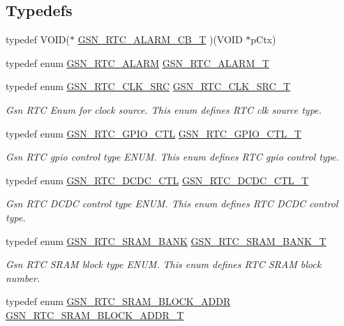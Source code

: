 \subsection*{Typedefs}
\begin{DoxyCompactItemize}
\item 
typedef VOID($\ast$ \hyperlink{a00582_a624c15b10850050c5064e7949e4bd15f}{GSN\_\-RTC\_\-ALARM\_\-CB\_\-T} )(VOID $\ast$pCtx)
\item 
typedef enum \hyperlink{a00582_a7ac2ec492b22971df1e2f294bdb35a06}{GSN\_\-RTC\_\-ALARM} \hyperlink{a00582_a55a97ef6cc63c0ef0c4032ed2324bd2f}{GSN\_\-RTC\_\-ALARM\_\-T}
\item 
typedef enum \hyperlink{a00651_gaace509e7754aacb14b76f77e68fa9b2a}{GSN\_\-RTC\_\-CLK\_\-SRC} \hyperlink{a00651_gadb97e494297aadf7b5dda5f239d96c80}{GSN\_\-RTC\_\-CLK\_\-SRC\_\-T}
\begin{DoxyCompactList}\small\item\em Gsn RTC Enum for clock source. This enum defines RTC clk source type. \end{DoxyCompactList}\item 
typedef enum \hyperlink{a00651_ga3481de456997229518bb1895981bfd74}{GSN\_\-RTC\_\-GPIO\_\-CTL} \hyperlink{a00651_gaac2b2cc7a6f64a96caddc19f3b3df78b}{GSN\_\-RTC\_\-GPIO\_\-CTL\_\-T}
\begin{DoxyCompactList}\small\item\em Gsn RTC gpio control type ENUM. This enum defines RTC gpio control type. \end{DoxyCompactList}\item 
typedef enum \hyperlink{a00651_ga9b99af1b9b8d009d88640121a1de2e9d}{GSN\_\-RTC\_\-DCDC\_\-CTL} \hyperlink{a00651_gadac67c4bef428c38b07db46ce0a24d23}{GSN\_\-RTC\_\-DCDC\_\-CTL\_\-T}
\begin{DoxyCompactList}\small\item\em Gsn RTC DCDC control type ENUM. This enum defines RTC DCDC control type. \end{DoxyCompactList}\item 
typedef enum \hyperlink{a00651_ga77c3be59f640309dc97a21e937aa9b3c}{GSN\_\-RTC\_\-SRAM\_\-BANK} \hyperlink{a00651_ga70bc76d00099ffb3dabb49354ff57870}{GSN\_\-RTC\_\-SRAM\_\-BANK\_\-T}
\begin{DoxyCompactList}\small\item\em Gsn RTC SRAM block type ENUM. This enum defines RTC SRAM block number. \end{DoxyCompactList}\item 
typedef enum \hyperlink{a00651_gaec3839be6e64287f1c0981aafc08548b}{GSN\_\-RTC\_\-SRAM\_\-BLOCK\_\-ADDR} \hyperlink{a00651_ga490147beeb60589ba19b9446b63b0ea0}{GSN\_\-RTC\_\-SRAM\_\-BLOCK\_\-ADDR\_\-T}

\end{DoxyCompactItemize}
